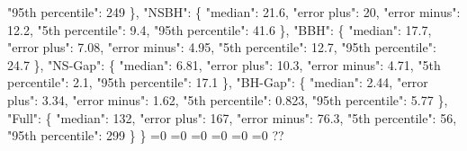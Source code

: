 {{        "95th percentile": 249%
      \}, %
      "NSBH": \{%
        "median": 21.6, %
        "error plus": 20, %
        "error minus": 12.2, %
        "5th percentile": 9.4, %
        "95th percentile": 41.6%
      \}, %
      "BBH": \{%
        "median": 17.7, %
        "error plus": 7.08, %
        "error minus": 4.95, %
        "5th percentile": 12.7, %
        "95th percentile": 24.7%
      \}, %
      "NS{-}Gap": \{%
        "median": 6.81, %
        "error plus": 10.3, %
        "error minus": 4.71, %
        "5th percentile": 2.1, %
        "95th percentile": 17.1%
      \}, %
      "BH{-}Gap": \{%
        "median": 2.44, %
        "error plus": 3.34, %
        "error minus": 1.62, %
        "5th percentile": 0.823, %
        "95th percentile": 5.77%
      \}, %
      "Full": \{%
        "median": 132, %
        "error plus": 167, %
        "error minus": 76.3, %
        "5th percentile": 56, %
        "95th percentile": 299%
      \}%
    \}}%
  \else%
    \ifnum{}=0%
      \let\FullPop@I@out\FullPop@III%
    \else%
      \ifnum{}=0%
      \let\FullPop@I@out\FullPop@IV%
    \else%
      \ifnum{}=0%
      \let\FullPop@I@out\FullPop@V%
    \else%
      \ifnum{}=0%
      \let\FullPop@I@out\FullPop@VI%
    \else%
      \ifnum{}=0%
      \let\FullPop@I@out\FullPop@VII%
    \else%
      \ifnum{}=0%
      \let\FullPop@I@out\FullPop@VIII%
    \else%
      \def\FullPop@I@out{%
    ??}%
    \fi\fi\fi\fi\fi\fi
  \fi
  \FullPop@I@out
}\newcommand\FullPop@II[1][all]{%
  \ifnum\pdfstrcmp{#1}{all}=0%
    \def\FullPop@II@out{%
    \{%
      "OneMsun": \{%
        "median": 1.22, %
        "error plus": 0.133, %
        "error minus": 0.143, %
        "5th percentile": 1.08, %
        "95th percentile": 1.35%
      \}, %
      "TenMsun": \{%
        "median": 9.09, %
        "error plus": 0.376, %
        "error minus": 0.778, %
        "5th percentile": 8.31, %
        "95th percentile": 9.47%
      \}, %
      "ThirtyMsun": \{%
        "median": 25.1, %
        "error plus": 12.5, %
        "error minus": 6.9, %
        "5th percentile": 18.2, %
        "95th percentile": 37.6%
      \}%
    \}}%
  \else%
    \ifnum\pdfstrcmp{#1}{OneMsun}=0%
      \let\FullPop@II@out\FullPop@IX%
    \else%
      \ifnum\pdfstrcmp{#1}{TenMsun}=0%
      \let\FullPop@II@out\FullPop@X%
    \else%
      \ifnum\pdfstrcmp{#1}{ThirtyMsun}=0%
      \let\FullPop@II@out\FullPop@XI%
    \else%
      \def\FullPop@II@out{%
    ??}%
    \fi\fi\fi
  \fi
  \FullPop@II@out
}\newcommand\FullPop@III[1][all]{%
}
